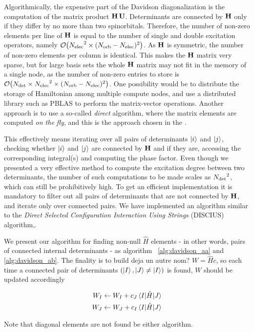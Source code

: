 \documentclass[./thesis.tex]{subfiles}
\begin{document}
    
Algorithmically, the expensive part of the Davidson diagonalization is the computation of the matrix product $\mathbf{H}\, \mathbf{U}$.
Determinants are connected by $\mathbf{H}$ only if they differ by no more than two
spinorbitals. Therefore, the number of non-zero elements per line of $\mathbf{H}$ is
equal to the number of single and double excitation operators, namely
$\order{\Nelec^2 \times (\Norb - \Nelec)^2}$. As $\mathbf{H}$ is symmetric, the number
of non-zero elements per column is identical. This makes the $\mathbf{H}$ matrix very
sparse, but for large basis sets the whole $\mathbf{H}$ matrix may not fit in the
memory of a single node, as the number of non-zero entries to store is
$\order{\Ndet \times \Nelec^2 \times (\Norb - \Nelec)^2}$.  One possibility
would be to distribute the storage of Hamiltonian among multiple compute nodes,
and use a distributed library such as PBLAS\cite{pblas} to perform the
matrix-vector operations. Another approach is to use a so-called \emph{direct}
algorithm, where the matrix elements are computed \emph{on the fly}, and this
is the approach chosen in the \QP.


This effectively means iterating over all pairs of determinants ${\ket{i}}$ and
${\ket{j}}$, checking whether ${\ket{i}}$ and ${\ket{j}}$ are connected by $\mathbf{H}$ and if they are,
accessing the corresponding integral(s) and computing the phase factor.  Even
though we presented a very effective method to compute the excitation degree
between two determinants, the number of such computations to be made scales as
${N_\text{det}}^2$, which can still be prohibitively high. To get an efficient
implementation it is mandatory to filter out all pairs of determinants that are
not connected by $\mathbf{H}$, and iterate only over connected pairs.  We have
implemented an algorithm similar to the \emph{Direct Selected Configuration
Interaction Using Strings} (DISCIUS) algorithm,\cite{Povill_1995}.

We present our algorithm for finding non-null $\widehat{H}$ elements - in other words, pairs of connected internal determinants - as algorithm ~\ref{alg:davidson_aa} and \ref{alg:davidson_ab}. The finality is to build \alert{deja un autre nom?} $W = \widehat{H} c$, so each time a connected pair of determinants $(\ket I, \ket J \neq \ket I)$ is found, $W$ should be updated accordingly

\begin{align}
W_I \gets W_I + c_J \mel{I}{\hat{H}}{J} \\
W_J \gets W_J + c_I \mel{I}{\hat{H}}{J}
\end{align}

Note that diagonal elements are not found be either algorithm.
\end{document}
